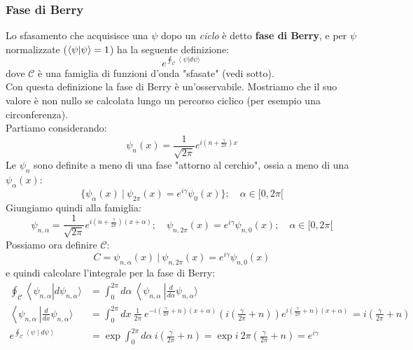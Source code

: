 \documentclass[../../FisicaTeorica.tex]{subfiles}
\begin{document}
\subsubsection{Fase di Berry}
Lo sfasamento che acquisisce una $\psi$ dopo un \textit{ciclo} è detto \textbf{fase di Berry}, e per $\psi$ normalizzate ($\braket{\psi|\psi} = 1$) ha la seguente definizione:
\[
e^{\oint_{\mathcal{C}}{\left\langle\psi\right|d\psi\rangle\ }}
\]
dove $\mathcal{C}$ è una famiglia di funzioni d'onda "sfasate" (vedi sotto).\\
Con questa definizione la fase di Berry è un'osservabile. Mostriamo che il suo valore è non nullo se calcolata lungo un percorso ciclico (per esempio una circonferenza).\\
Partiamo considerando:
\[
\psi_n\left(x\right)=\frac{1}{\sqrt{2\pi}}e^{i\left(n+\frac{\gamma}{2\pi}\right)x}
\]
Le $\psi_n$ sono definite a meno di una fase "attorno al cerchio", ossia a meno di una $\psi_\alpha(x)$:
\[
\{\psi_\alpha(x)\>|\>\psi_{2\pi}(x) = e^{i\gamma} \psi_0(x)\}; \quad \alpha \in [0,2\pi[
\]
Giungiamo quindi alla famiglia:
\[
\psi_{n,\alpha}=\frac{1}{\sqrt{2\pi}}e^{i\left(n+\frac{\gamma}{2\pi}\right)\left(x+\alpha\right)}; \quad \psi_{n,2\pi}(x) = e^{i\gamma}\psi_{n,0}(x); \quad \alpha \in [0,2\pi [
\]
Possiamo ora definire $\mathcal{C}$:
\[
C=\psi_{n,\alpha}\left(x\right)\>|\>  \psi_{n,2\pi}\left(x\right)=e^{i\gamma}\psi_{n,0}(x)
\]
e quindi calcolare l'integrale per la fase di Berry:
\begin{align*}
\oint_{\mathcal{C}}{\left\langle\psi_{n,\alpha}\right|d\psi_{n,\alpha}\rangle}&=\int_{0}^{2\pi}{d\alpha\ \left\langle\psi_{n,\alpha}\ \right|\frac{d}{d\alpha}\psi_{n,\alpha}\rangle\ }\\
\left\langle\psi_{n,\alpha}\ \right|\frac{d}{dx}\psi_{n,\alpha} \rangle &=\int_{0}^{2\pi}{dx\ \frac{1}{2\pi}\ e^{-i\left(\frac{\gamma}{2\pi}+n\right)\left(x+\alpha\right)}\left(i\left(\frac{\gamma}{2\pi}+n\right)\right)e^{i\left(\frac{\gamma}{2\pi}+n\right)\left(x+\alpha\right)\ }}=i\left(\frac{\gamma}{2\pi}+n\right)\\
e^{\oint_{\mathcal{C}}\left\langle\psi\middle| d\psi\right\rangle}&=\exp{\int_{0}^{2\pi}{d\alpha\ i\left(\frac{\gamma}{2\pi}+n\right)}}=\exp{i\ 2\pi\left(\frac{\gamma}{2\pi}+n\right)}=e^{i\gamma} 
\end{align*}
\end{document}
